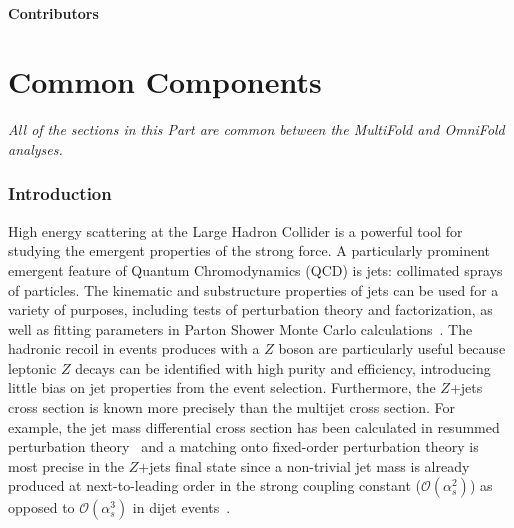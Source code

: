 \subsection{Contributors}


\clearpage



\clearpage

\part{Common Components}
\label{part:common}

\textit{All of the sections in this Part are common between the MultiFold and OmniFold analyses.}

\section{Introduction}
\label{sec:intro}

High energy scattering at the Large Hadron Collider is a powerful tool for studying the emergent properties of the strong force.  A particularly prominent emergent feature of Quantum Chromodynamics (QCD) is jets: collimated sprays of particles.  The kinematic and substructure properties of jets can be used for a variety of purposes, including tests of perturbation theory and factorization, as well as fitting parameters in Parton Shower Monte Carlo calculations~\cite{Larkoski:2017jix,Kogler:2018hem}.  The hadronic recoil in events produces with a $Z$ boson are particularly useful because leptonic $Z$ decays can be identified with high purity and efficiency, introducing little bias on jet properties from the event selection.  Furthermore, the $Z$+jets cross section is known more precisely than the multijet cross section.  For example, the jet mass differential cross section has been calculated in resummed perturbation theory~\cite{Kang:2018jwa,Dasgupta:2012hg,Chien:2012ur} and a matching onto fixed-order perturbation theory is most precise in the $Z$+jets final state since a non-trivial jet mass is already produced at next-to-leading order in the strong coupling constant ($\mathcal{O}(\alpha_s^2)$) as opposed to $\mathcal{O}(\alpha_s^3)$ in dijet events~\cite{Frye:2016okc,Frye:2016aiz}.  

